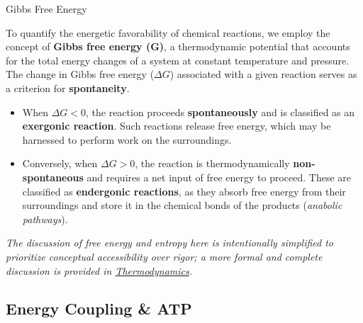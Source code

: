 \documentclass[10pt]{article}
\begin{document}
    \begin{core}{Gibbs Free Energy}

      To quantify the energetic favorability of chemical reactions, we employ the concept of \textbf{Gibbs free energy (G)}, a thermodynamic potential that accounts for the total energy changes of a system at constant temperature and pressure. The change in Gibbs free energy ($\Delta G$) associated with a given reaction serves as a criterion for \textbf{spontaneity}.

      \begin{itemize}

        \item When $\Delta G < 0$, the reaction proceeds \textbf{spontaneously} and is classified as an \textbf{exergonic reaction}. Such reactions release free energy, which may be harnessed to perform work on the surroundings.


        \item Conversely, when $\Delta G > 0$, the reaction is thermodynamically \textbf{non-spontaneous} and requires a net input of free energy to proceed. These are classified as \textbf{endergonic reactions}, as they absorb free energy from their surroundings and store it in the chemical bonds of the products (\textit{anabolic pathways}).


      \end{itemize}

    \end{core}

    \textit{The discussion of free energy and entropy here is intentionally simplified to prioritize conceptual accessibility over rigor; a more formal and complete discussion is provided in \href{https://ibahng.github.io/chemistry/thermodynamics/thermodynamics.pdf}{Thermodynamics}.}

  \subsection{Energy Coupling \& ATP}
\end{document}
